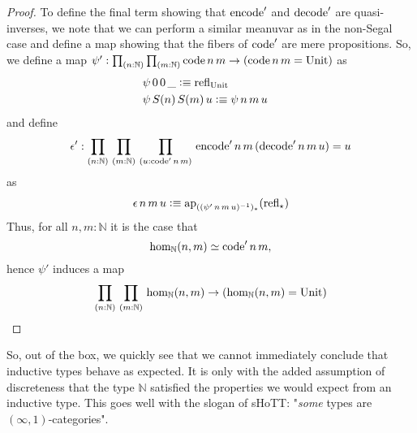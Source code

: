 \documentclass[main.tex]{subfiles}
\begin{document}
\begin{proof}
    To define the final term showing that $\eco'$ and $\dco'$ are quasi-inverses, we note that we can perform a similar
    meanuvar as in the non-Segal case and define a map showing that the fibers of $\co'$ are mere propositions. So, we define a map
     $\psi' : \prd{n : \mathbb{N}}{m : \mathbb{N}}\co\,n\,m \to (\co\,n\,m = \Un)$ as
    \begin{align*}
        &\psi\,0\,0\,\_\defeq \refl{\Un}\\
        &\psi\,S(n)\,S(m)\,u\defeq\psi\,n\,m\,u&
    \end{align*}
    and define 
$$\epsilon' : \prd{n:\mathbb{N}}{m:\mathbb{N}}{u : \co' \, n\, m}\eco'\,n\,m\,(\dco'\,n\,m \,u) =u$$
as
\begin{align*}
    \epsilon\,n\,m\,u \defeq \text{ap}_{((\psi'\,n\,m\,u)^{-1})_*}(\refl{\star})
\end{align*}
    Thus, for all $n,m : \mathbb{N}$ it is the case that
    $$\ho[\mathbb{N}]{n}{m}\simeq \co'\,n\,m,$$ hence $\psi'$ induces a map
    $$\prd{n : \mathbb{N}}{m : \mathbb{N}}\ho[\mathbb{N}]{n}{m} \to (\ho[\mathbb{N}]{n}{m} = \Un)$$
\end{proof}

So, out of the box, we quickly see that we cannot immediately conclude that inductive types behave as expected. It is only with
the added assumption of discreteness that the type $\mathbb{N}$ satisfied the properties we would expect from an inductive type.
This goes well with the slogan of sHoTT: "\textit{some} types are $(\infty,1)$-categories". 
\end{document}
